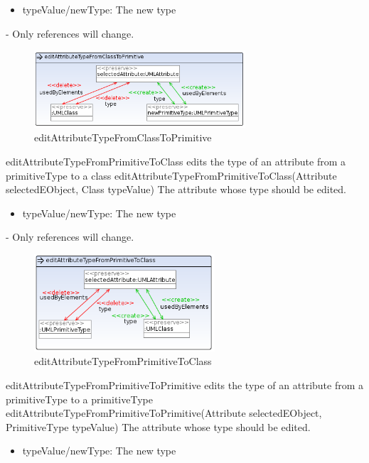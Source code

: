 {
\begin{itemize}
 \item typeValue/newType: The new type
\end{itemize}
}
{-}
{Only references will change.}
\begin{figure}[H]
  \centering
  \includegraphics[width=0.7\textwidth]{pics/editAttributeTypeFromClassToPrimitive.png}    
  \caption{editAttributeTypeFromClassToPrimitive}
  \label{editAttributeTypeFromClassToPrimitive}  
\end{figure}
\op
{editAttributeTypeFromPrimitiveToClass}
{edits the type of an attribute from a primitiveType to a class}
{editAttributeTypeFromPrimitiveToClass(Attribute selectedEObject, Class typeValue)}
{The attribute whose type should be edited.}
{
\begin{itemize}
 \item typeValue/newType: The new type
\end{itemize}
}
{-}
{Only references will change.}
\begin{figure}[H]
  \centering
  \includegraphics[width=0.60\textwidth]{pics/editAttributeTypeFromPrimitiveToClass.png}    
  \caption{editAttributeTypeFromPrimitiveToClass}
  \label{editAttributeTypeFromPrimitiveToClass}  
\end{figure}
\op
{editAttributeTypeFromPrimitiveToPrimitive}
{edits the type of an attribute from a primitiveType to a primitiveType}
{editAttributeTypeFromPrimitiveToPrimitive(Attribute selectedEObject, PrimitiveType typeValue)}
{The attribute whose type should be edited.}
{
\begin{itemize}
 \item typeValue/newType: The new type
\end{itemize}
}

